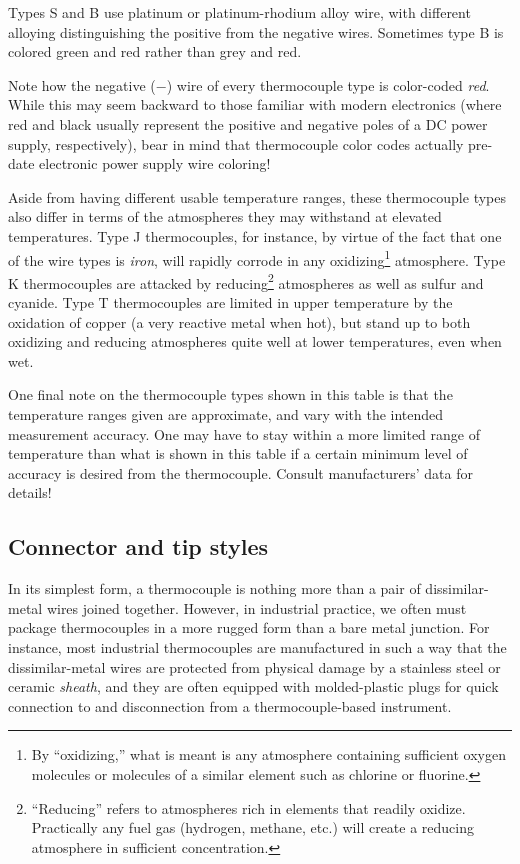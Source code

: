 Types S and B use platinum or platinum-rhodium alloy wire, with different alloying distinguishing the positive from the negative wires.  Sometimes type B is colored green and red rather than grey and red.

Note how the negative ($-$) wire of every thermocouple type is color-coded \textit{red}.  While this may seem backward to those familiar with modern electronics (where red and black usually represent the positive and negative poles of a DC power supply, respectively), bear in mind that thermocouple color codes actually pre-date electronic power supply wire coloring!

Aside from having different usable temperature ranges, these thermocouple types also differ in terms of the atmospheres they may withstand at elevated temperatures.  Type J thermocouples, for instance, by virtue of the fact that one of the wire types is \textit{iron}, will rapidly corrode in any oxidizing\footnote{By ``oxidizing,'' what is meant is any atmosphere containing sufficient oxygen molecules or molecules of a similar element such as chlorine or fluorine.} atmosphere.  Type K thermocouples are attacked by reducing\footnote{``Reducing'' refers to atmospheres rich in elements that readily oxidize.  Practically any fuel gas (hydrogen, methane, etc.) will create a reducing atmosphere in sufficient concentration.} atmospheres as well as sulfur and cyanide.  Type T thermocouples are limited in upper temperature by the oxidation of copper (a very reactive metal when hot), but stand up to both oxidizing and reducing atmospheres quite well at lower temperatures, even when wet.

One final note on the thermocouple types shown in this table is that the temperature ranges given are approximate, and vary with the intended measurement accuracy.  One may have to stay within a more limited range of temperature than what is shown in this table if a certain minimum level of accuracy is desired from the thermocouple.  Consult manufacturers' data for details!






\filbreak
\subsection{Connector and tip styles}

In its simplest form, a thermocouple is nothing more than a pair of dissimilar-metal wires joined together.  However, in industrial practice, we often must package thermocouples in a more rugged form than a bare metal junction.  For instance, most industrial thermocouples are manufactured in such a way that the dissimilar-metal wires are protected from physical damage by a stainless steel or ceramic \textit{sheath}, and they are often equipped with molded-plastic plugs for quick connection to and disconnection from a thermocouple-based instrument.

